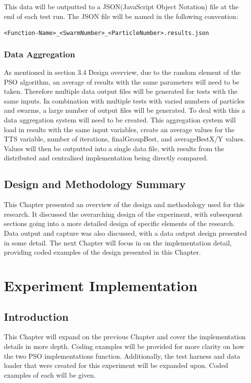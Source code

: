 \documentclass[oneside,12pt]{book}
\begin{document}
This data will be outputted to a JSON(JavaScript Object Notation) file at the end of each test run. The JSON file will be named in the following convention:

\verb|<Function-Name>_<SwarmNumber>_<ParticleNumber>.results.json|


\subsection{Data Aggregation}
As mentioned in section 3.4 Design overview, due to the random element of the PSO algorithm, an average of results with the same parameters will need to be taken. Therefore multiple data output files will be generated for tests with the same inputs. In combination with multiple tests with varied numbers of particles and swarms, a large number of output files will be generated. To deal with this a data aggregation system will need to be created. This aggregation system will load in results with the same input variables, create an average values for the TTS variable, number of iterations, finalGroupBest, and averageBestX/Y values. Values will then be outputted into a single data file, with results from the distributed and centralised implementation being directly compared.

\section{Design and Methodology Summary}
This Chapter presented an overview of the design and methodology used for this research. It discussed the overarching design of the experiment, with subsequent sections going into a more detailed design of specific elements of the research. Data output and capture was also discussed, with a data output design presented in some detail. 
The next Chapter will focus in on the implementation detail, providing coded examples of the design presented in this Chapter. 

\chapter{Experiment Implementation}

\section{Introduction}
This Chapter will expand on the previous Chapter and cover the implementation details in more depth. Coding examples will be provided for more clarity on how the two PSO implementations function. Additionally, the test harness and data loader that were created for this experiment will be expanded upon. Coded examples of each will be given.
\end{document}
